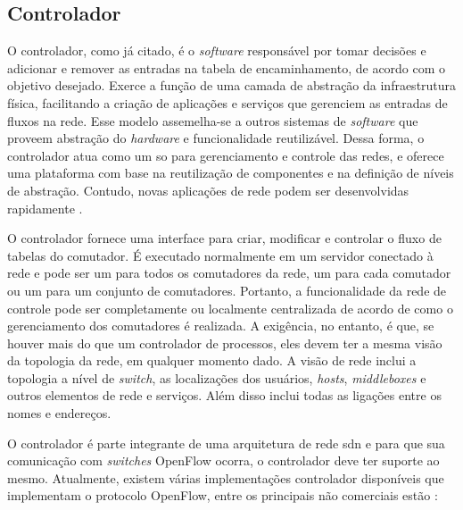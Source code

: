 \subsection{Controlador}
\label{subsec:controlador}

O controlador, como já citado, é o \textit{software} responsável por tomar decisões e adicionar e remover as entradas na tabela de encaminhamento, de acordo com o objetivo desejado. Exerce a função de uma camada de abstração da infraestrutura física, facilitando a criação de aplicações e serviços que gerenciem as entradas de fluxos na rede. Esse modelo assemelha-se a outros sistemas de \textit{software} que proveem abstração do \textit{hardware} e funcionalidade reutilizável. Dessa forma, o controlador atua como um \gls{so} para gerenciamento e controle das redes, e oferece uma plataforma com base na reutilização de componentes e na definição de níveis de abstração. Contudo, novas aplicações de rede podem ser desenvolvidas rapidamente \cite{Gude:2008}.

O controlador fornece uma interface para criar, modificar e controlar o fluxo de tabelas do comutador. É executado normalmente em um servidor conectado à rede e pode ser um para todos os comutadores da rede, um para cada comutador ou um para um conjunto de comutadores.  Portanto, a funcionalidade da rede de controle pode ser completamente ou localmente centralizada de acordo de como o gerenciamento dos comutadores é realizada. A exigência, no entanto, é que, se houver mais do que um controlador de processos, eles devem ter a mesma visão da topologia da rede, em qualquer momento dado. A visão de rede inclui a topologia a nível de \textit{switch}, as localizações dos usuários, \textit{hosts}, \textit{middleboxes} e outros elementos de rede e serviços. Além disso inclui todas as ligações entre os nomes e endereços.

O controlador é parte integrante de uma arquitetura de rede \gls{sdn} e para que sua comunicação com \textit{switches} OpenFlow ocorra, o controlador deve ter suporte ao mesmo. Atualmente, existem várias implementações controlador disponíveis que implementam o protocolo OpenFlow, entre os principais não comerciais estão \cite{Kreutz:2013,Xia:2015}:

